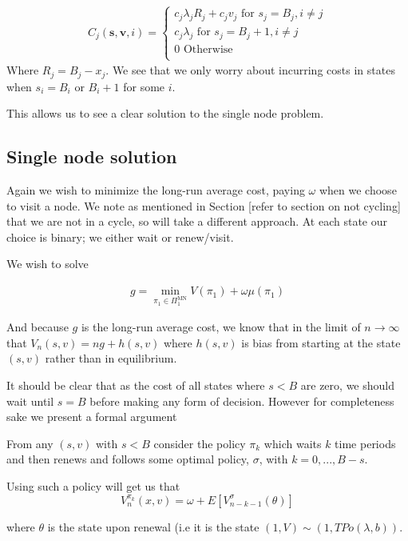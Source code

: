 \documentclass[a4paper,10pt]{article}
\theoremstyle{definition}
\theoremstyle{definition}
\theoremstyle{remark}
\theoremstyle{definition}
\begin{document}
\begin{align*}
C_{j}(\bm{s},\bm{v},i)=\begin{cases}
c_{j} \lambda_{j} R_{j} + c_{j} v_{j}  \text{ for } s_{j}=B_{j},i \neq j \\ 
c_{j} \lambda_{j} \text{ for } s_{j}=B_{j}+1,i \neq j  \\
0 \text{ Otherwise} \\
\end{cases}
\end{align*}
Where $R_{j}=B_{j}-x_{j}$. We see that we only worry about incurring costs in states when $s_{i}=B_{i}$ or $B_{i}+1$ for some $i$.

This allows us to see a clear solution to the single node problem.

\subsection{Single node solution}
\label{Section:Single node solution}
Again we wish to minimize the long-run average cost, paying $\omega$ when we choose to visit a node. We note as mentioned in Section [refer to section on not cycling] that we are not in a cycle, so will take a different approach. At each state our choice is binary; we either wait or renew/visit.

We wish to solve

\begin{align*}
g=\min\limits_{\pi_{1} \in \Pi^{\text{MN}}_{1}} V(\pi_{1})+\omega \mu(\pi_{1})
\end{align*}

And because $g$ is the long-run average cost, we know that in the limit of $n \rightarrow \infty$ that $V_{n}(s,v)=ng + h(s,v)$ where $h(s,v)$ is bias from starting at the state $(s,v)$ rather than in equilibrium.

It should be clear that as the cost of all states where $s<B$ are zero, we should wait until $s=B$ before making any form of decision. However for completeness sake we present a formal argument

From any $(s,v)$ with $s<B$ consider the policy $\pi_{k}$ which waits $k$ time periods and then renews and follows some optimal policy, $\sigma$, with $k=0,...,B-s$.

Using such a policy will get us that
\begin{equation}
V_{n}^{\pi_{k}}(x,v)=\omega + E[V_{n-k-1}^{\sigma}(\theta)]
\end{equation}

where $\theta$ is the state upon renewal (i.e it is the state $(1,V) \sim (1,TPo(\lambda,b))$.
\end{document}
